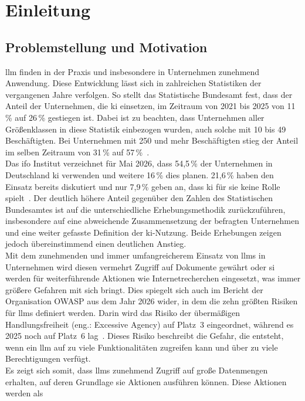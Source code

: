 \chapter{Einleitung}\label{ch:einleitung}


\section{Problemstellung und Motivation}

\acf{llm} finden in der Praxis und insbesondere in Unternehmen zunehmend Anwendung. Diese Entwicklung lässt sich in zahlreichen Statistiken der vergangenen 
Jahre verfolgen. So stellt das Statistische Bundesamt fest, dass der Anteil der Unternehmen, die \ac{ki} einsetzen, im Zeitraum von 2021 bis 2025 von 
11\,\% auf 26\,\% gestiegen ist. Dabei ist zu beachten, dass Unternehmen aller Größenklassen in diese Statistik einbezogen wurden, auch solche mit 10 bis 
49 Beschäftigten. Bei Unternehmen mit 250 und mehr Beschäftigten stieg der Anteil im selben Zeitraum von 31\,\% auf 57\,\%~\cite{e01}. \\
Das ifo Institut verzeichnet für Mai 2026, dass 54,5\,\% der Unternehmen in Deutschland \ac{ki} verwenden und weitere 16\,\% dies planen. 21,6\,\% haben den Einsatz
bereits diskutiert und nur 7,9\,\% geben an, dass \ac{ki} für sie keine Rolle spielt~\cite{e02}. Der deutlich höhere Anteil gegenüber den Zahlen des 
Statistischen Bundesamtes ist auf die unterschiedliche Erhebungsmethodik zurückzuführen, insbesondere auf eine abweichende Zusammensetzung der befragten Unternehmen
und eine weiter gefasste Definition der \ac{ki}-Nutzung. Beide Erhebungen zeigen jedoch übereinstimmend einen deutlichen Anstieg. \\
Mit dem zunehmenden und immer umfangreicherem Einsatz von \acp{llm} in Unternehmen wird diesen vermehrt Zugriff auf Dokumente gewährt oder si werden für weiterführende 
Aktionen wie Internetrecherchen eingesetzt, was immer größere Gefahren mit sich bringt.
Dies spiegelt sich auch im Bericht der Organisation OWASP aus dem Jahr 2026 wider, in dem die zehn größten Risiken für \acp{llm} definiert werden. Darin wird
das Risiko der übermäßigen Handlungsfreiheit (eng.: Excessive Agency) auf Platz~3 eingeordnet, während es 2025 noch auf Platz~6 lag~\cite{pi24}. Dieses Risiko beschreibt die Gefahr, die 
entsteht, wenn ein \ac{llm} auf zu viele Funktionalitäten zugreifen kann und über zu viele Berechtigungen verfügt. \\
Es zeigt sich somit, dass \acp{llm} zunehmend Zugriff auf große Datenmengen erhalten, auf deren Grundlage sie Aktionen ausführen können. Diese Aktionen werden als
